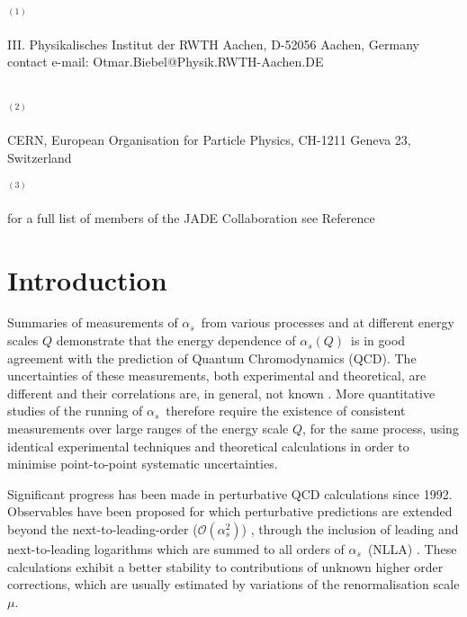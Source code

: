 \documentclass[12pt,a4paper,twoside]{article}
\newcommand{\as}     {\ensuremath{\alpha_s}}
\newcommand{\asq}    {\ensuremath{\alpha_s(Q)}}
\newcommand{\oaa}    {\ensuremath{\mathcal{O}(\alpha_s^2)}}
\begin{document}
\begin{titlepage}
\vspace*{0pt\vfill}
\vfill
%
\bigskip\bigskip\bigskip\bigskip

{
\small
\noindent
$^{(1)}$ 
\begin{minipage}[t]{155mm} 
III. Physikalisches Institut der RWTH Aachen,
D-52056 Aachen, Germany \\
contact e-mail: Otmar.Biebel@Physik.RWTH-Aachen.DE
\end{minipage}\\
$^{(2)}$ 
\begin{minipage}[t]{155mm} 
CERN, European Organisation for Particle Physics, CH-1211 Geneva 23, Switzerland
\end{minipage}
$^{(3)}$ 
\begin{minipage}[t]{155mm} 
for a full list of members of the JADE Collaboration see Reference \cite{bib-naroska}
\end{minipage}
\hspace*{0pt\hfill}
}


\end{titlepage}
%
%
\newpage
\section{ Introduction }
Summaries of measurements of \as\ from various processes and at
different energy scales $Q$
demonstrate \cite{bib-world-alphas-sb,bib-world-alphas-ms} that the energy
dependence of \asq\ is
in good agreement with the prediction of Quantum Chromodynamics (QCD). 
The uncertainties of these measurements, 
both experimental and theoretical, are different and their correlations 
are, in general, not known \cite{bib-world-alphas-sb,bib-world-alphas-ms}.
More quantitative studies of the running of \as\ therefore require the
existence of consistent measurements over large ranges of the
energy scale $Q$, for the same process, using identical experimental
techniques and theoretical calculations in order to minimise
point-to-point systematic uncertainties.

Significant progress has been made in perturbative QCD calculations since
1992. Observables have been proposed for which perturbative predictions 
are extended beyond the next-to-leading-order (\oaa ) \cite{bib-ERT}, 
through the inclusion of leading and next-to-leading logarithms which 
are summed to all orders of \as\ (NLLA) 
\cite{bib-NLLA-1,bib-NLLA-2,bib-NLLA-3}.
These calculations exhibit a better stability to contributions of 
unknown higher order corrections, which are usually estimated by 
variations of the renormalisation scale $\mu$.
\end{document}
